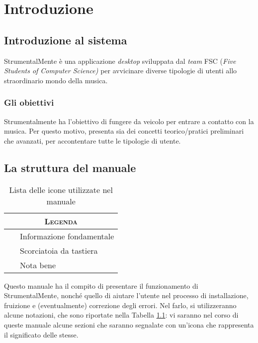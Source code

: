 \chapter{Introduzione}

\section{Introduzione al sistema}

StrumentalMente è una applicazione \emph{desktop} sviluppata dal
\emph{team} FSC (\emph{Five Students of Computer Science)} per
avvicinare diverse tipologie di utenti allo straordinario mondo della
musica.

\subsection{Gli obiettivi}

Strumentalmente ha l'obiettivo di fungere da veicolo per entrare a
contatto con la musica. Per questo motivo, presenta sia dei concetti
teorico/pratici preliminari che avanzati, per accontentare tutte le
tipologie di utente.

\section{La struttura del manuale}

\begin{table}[H]
	\centering
	\begin{tabular}{@{}l@{}}
		\toprule
		\multicolumn{1}{c}{\textsc{\textbf{Legenda}}}\\
		\midrule
		{\Large\faInfoCircle{}}~~~Informazione fondamentale\\
		\midrule
		{\Large\faKeyboardO{}}~~~Scorciatoia da tastiera\\
		\midrule
		{\Large\faWarning{}}~~~Nota bene\\
		\bottomrule
	\end{tabular}
	\caption{Lista delle icone utilizzate nel manuale}
	\label{tab:icons}
\end{table}

Questo manuale ha il compito di presentare il funzionamento di
StrumentalMente, nonché quello di aiutare l'utente nel processo di
installazione, fruizione e (eventualmente) correzione degli errori. Nel
farlo, si utilizzeranno alcune notazioni, che sono riportate nella
Tabella \ref{tab:icons}: vi saranno nel corso di queste manuale alcune sezioni che saranno segnalate con un'icona che rappresenta il significato delle stesse.

